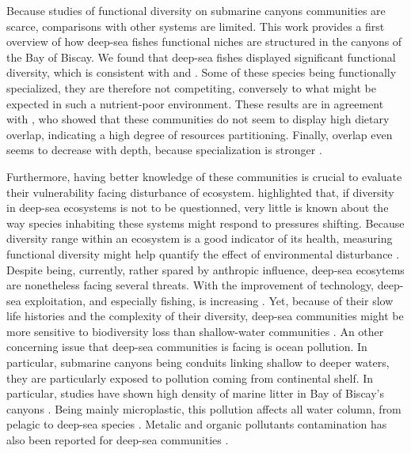 
Because studies of functional diversity on submarine canyons communities are scarce, comparisons with other systems are limited. This work provides a first overview of how deep-sea fishes functional niches are structured in the canyons of the Bay of Biscay. We found that deep-sea fishes displayed significant functional diversity, which is consistent with \citet{aneeshkumar2017} and \citet{carrington2021}. Some of these species being functionally specialized, they are therefore not competiting, conversely to what might be expected in such a nutrient-poor environment. These results are in agreement with \citet{preciado2017}, who showed that these communities do not seem to display high dietary overlap, indicating a high degree of resources partitioning. Finally, overlap even seems to decrease with depth, because specialization is stronger \citep{carrasson2002,farre2016}. 

Furthermore, having better knowledge of these communities is crucial to evaluate their vulnerability facing disturbance of ecosystem. \citet{carrington2021} highlighted that, if diversity in deep-sea ecosystems is not to be questionned, very little is known about the way species inhabiting these systems might respond to pressures shifting. Because diversity range within an ecosystem is a good indicator of its health, measuring functional diversity might help quantify the effect of environmental disturbance \citet{carrington2021,villeger2017}. Despite being, currently, rather spared by anthropic influence, deep-sea ecosytems are nonetheless facing several threats. With the improvement of technology, deep-sea exploitation, and especially fishing, is increasing \citep{carrington2021}. Yet, because of their slow life histories and the complexity of their diversity, deep-sea communities might be more sensitive to biodiversity loss than shallow-water communities \citep{carrington2021,danovaro2017}. An other concerning issue that deep-sea communities is facing is ocean pollution. In particular, submarine canyons being conduits linking shallow to deeper waters, they are particularly exposed to pollution coming from continental shelf. In particular, studies have shown high density of marine litter in Bay of Biscay's canyons \citep{vandenbeld2017}. Being mainly microplastic, this pollution affects all water column, from pelagic to deep-sea species \citep{pereira2020}. Metalic and organic pollutants contamination has also been reported for deep-sea communities \citep{spitz2019}.

